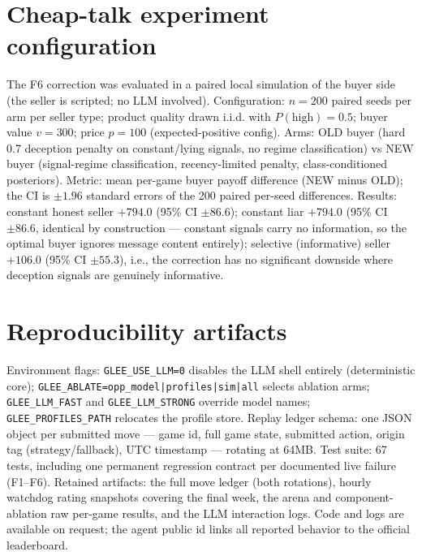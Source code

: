 \documentclass{article}
\begin{document}
\section{Cheap-talk experiment configuration}
\label{app:cheapalk}
The F6 correction was evaluated in a paired local simulation of the buyer side (the seller is scripted; no LLM involved). Configuration: $n=200$ paired seeds per arm per seller type; product quality drawn i.i.d. with $P(\text{high})=0.5$; buyer value $v=300$; price $p=100$ (expected-positive config). Arms: OLD buyer (hard 0.7 deception penalty on constant/lying signals, no regime classification) vs NEW buyer (signal-regime classification, recency-limited penalty, class-conditioned posteriors). Metric: mean per-game buyer payoff difference (NEW minus OLD); the CI is $\pm 1.96$ standard errors of the 200 paired per-seed differences. Results: constant honest seller $+794.0$ (95\% CI $\pm 86.6$); constant liar $+794.0$ (95\% CI $\pm 86.6$, identical by construction --- constant signals carry no information, so the optimal buyer ignores message content entirely); selective (informative) seller $+106.0$ (95\% CI $\pm 55.3$), i.e., the correction has no significant downside where deception signals are genuinely informative.

\section{Reproducibility artifacts}
\label{app:repro}
Environment flags: \texttt{GLEE\_USE\_LLM=0} disables the LLM shell entirely (deterministic core); \texttt{GLEE\_ABLATE=opp\_model|profiles|sim|all} selects ablation arms; \texttt{GLEE\_LLM\_FAST} and \texttt{GLEE\_LLM\_STRONG} override model names; \texttt{GLEE\_PROFILES\_PATH} relocates the profile store. Replay ledger schema: one JSON object per submitted move --- game id, full game state, submitted action, origin tag (strategy/fallback), UTC timestamp --- rotating at 64MB. Test suite: 67 tests, including one permanent regression contract per documented live failure (F1--F6). Retained artifacts: the full move ledger (both rotations), hourly watchdog rating snapshots covering the final week, the arena and component-ablation raw per-game results, and the LLM interaction logs. Code and logs are available on request; the agent public id links all reported behavior to the official leaderboard.


\end{document}
